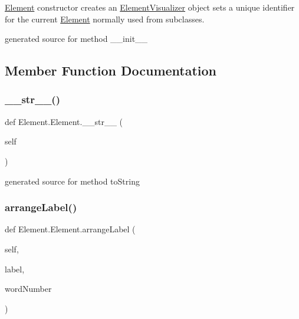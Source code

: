 \hyperlink{class_element_1_1_element}{Element} constructor creates an \hyperlink{namespace_element_visualizer}{Element\+Visualizer} object sets a unique identifier for the current \hyperlink{class_element_1_1_element}{Element} normally used from subclasses. 

\begin{DoxyVerb}generated source for method __init__ \end{DoxyVerb}
 

\subsection{Member Function Documentation}
\hypertarget{class_element_1_1_element_a2ffb262087576d15a2e93b864d4ce13a}{}\label{class_element_1_1_element_a2ffb262087576d15a2e93b864d4ce13a} 
\subsubsection{\texorpdfstring{\+\_\+\+\_\+str\+\_\+\+\_\+()}{\_\_str\_\_()}}
{\footnotesize\ttfamily def Element.\+Element.\+\_\+\+\_\+str\+\_\+\+\_\+ (\begin{DoxyParamCaption}\item[{}]{self }\end{DoxyParamCaption})}

\begin{DoxyVerb}generated source for method toString \end{DoxyVerb}
 \hypertarget{class_element_1_1_element_ab68f114977f0cc57c9499444d2bc8799}{}\label{class_element_1_1_element_ab68f114977f0cc57c9499444d2bc8799} 
\subsubsection{\texorpdfstring{arrange\+Label()}{arrangeLabel()}}
{\footnotesize\ttfamily def Element.\+Element.\+arrange\+Label (\begin{DoxyParamCaption}\item[{}]{self,  }\item[{}]{label,  }\item[{}]{word\+Number }\end{DoxyParamCaption})}

